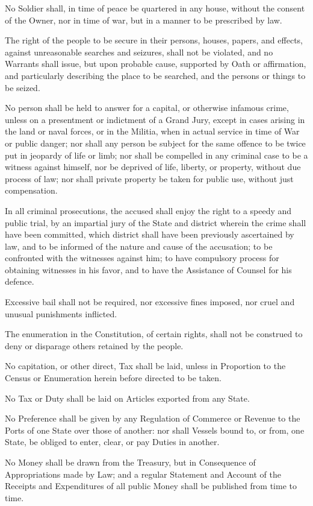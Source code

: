 \documentclass{constitution}
\begin{document}
No Soldier shall, in time of peace be quartered in any house,
without the consent of the Owner,
nor in time of war, but in a manner to be prescribed by law.

The right of the people to be secure in their persons, houses, papers, and effects,
against unreasonable searches and seizures, shall not be violated,
and no Warrants shall issue, but upon probable cause, supported by Oath or affirmation,
and particularly describing the place to be searched, and the persons or things to be seized.

No person shall be held to answer for a capital, or otherwise infamous crime,
unless on a presentment or indictment of a Grand Jury,
except in cases arising in the land or naval forces, or in the Militia,
when in actual service in time of War or public danger;
nor shall any person be subject for the same offence to be twice put in jeopardy of life or limb;
nor shall be compelled in any criminal case to be a witness against himself,
nor be deprived of life, liberty, or property, without due process of law;
nor shall private property be taken for public use, without just compensation.

In all criminal prosecutions,
the accused shall enjoy the right to a speedy and public trial,
by an impartial jury of the State and district wherein the crime shall have been committed,
which district shall have been previously ascertained by law,
and to be informed of the nature and cause of the accusation;
to be confronted with the witnesses against him;
to have compulsory process for obtaining witnesses in his favor,
and to have the Assistance of Counsel for his defence.

Excessive bail shall not be required,
nor excessive fines imposed,
nor cruel and unusual punishments inflicted.

The enumeration in the Constitution, of certain rights,
shall not be construed to deny or disparage others retained by the people.

No capitation, or other direct, Tax shall be laid,
unless in Proportion to the Census or Enumeration herein before directed to be taken.

No Tax or Duty shall be laid on Articles exported from any State.

No Preference shall be given by any Regulation of Commerce or Revenue
to the Ports of one State over those of another:
nor shall Vessels bound to, or from, one State,
be obliged to enter, clear, or pay Duties in another.

No Money shall be drawn from the Treasury,
but in Consequence of Appropriations made by Law;
and a regular Statement and Account
of the Receipts and Expenditures of all public Money
shall be published from time to time.
\end{document}
